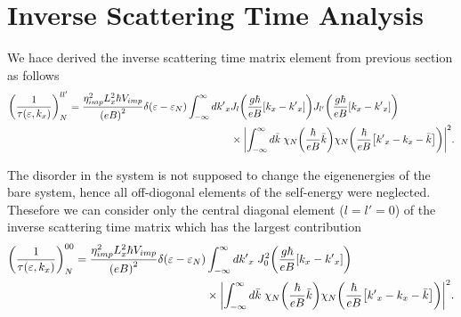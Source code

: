\section{Inverse Scattering Time Analysis}

We hace derived the inverse scattering time matrix element from previous section as follows
\begin{equation} \label{5.1}
  \begin{aligned}
    \qty(\frac{1}{\tau(\varepsilon,k_x)})^{ll'}_{N} =
    \frac { \eta_{imp}^2 L_x^2 \hbar V_{imp}}{\qty(eB)^2}
    \delta(\varepsilon - \varepsilon_{N})
    \int_{-\infty}^{\infty} d {k'}_x
    &
    J_l\qty(\frac{g\hbar}{eB}[{k}_x - {k'}_x])
    J_{l'}\qty(\frac{g\hbar}{eB}[{k}_x - {k'}_x]) \\
    & \times
    \qty|
    \int_{-\infty}^{\infty} d\bar{k} \;
    {\chi}_{N}\qty(\frac{\hbar}{eB}\bar{k})
    {\chi}_{N}\qty(\frac{\hbar}{eB} \qty[{k'}_x - {k}_x - \bar{k}])|^2.
  \end{aligned}
\end{equation}

\noindent
The disorder in the system is not supposed to change the eigenenergies of the bare system, hence all off-diogonal elements of the self-energy were neglected. Thesefore we can consider only the central diagonal element (${l=l'=0}$) of the inverse scattering time matrix which has the largest contribution
\begin{equation} \label{5.2}
  \begin{aligned}
    \qty(\frac{1}{\tau(\varepsilon,k_x)})^{00}_{N} =
    \frac { \eta_{imp}^2 L_x^2 \hbar V_{imp}}{\qty(eB)^2}
    \delta(\varepsilon - \varepsilon_{N}) &
    \int_{-\infty}^{\infty} d {k'}_x \;
    J_0^2\qty(\frac{g\hbar}{eB}[{k}_x - {k'}_x])
    \\
    & \times
    \qty|
    \int_{-\infty}^{\infty} d\bar{k} \;
    {\chi}_{N}\qty(\frac{\hbar}{eB}\bar{k})
    {\chi}_{N}\qty(\frac{\hbar}{eB} \qty[{k'}_x - {k}_x - \bar{k}])|^2.
  \end{aligned}
\end{equation}

